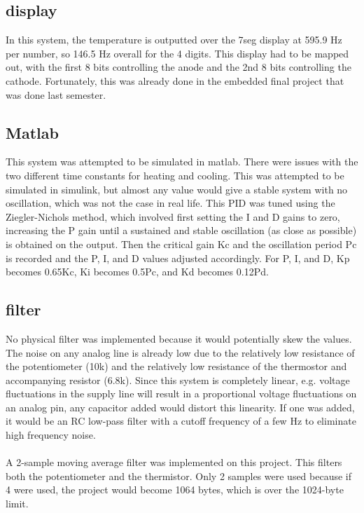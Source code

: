 \documentclass{hitec}
\begin{document}
\subsection{display}
In this system, the temperature is outputted over the 7seg display at 595.9 Hz per number, so 146.5 Hz overall for the 4 digits. This display had to be mapped out, with the first 8 bits controlling the anode and the 2nd 8 bits controlling the cathode. Fortunately, this was already done in the embedded final project that was done last semester. 
\\
\subsection{Matlab}
This system was attempted to be simulated in matlab. There were issues with the two different time constants for heating and cooling. This was attempted to be simulated in simulink, but almost any value would give a stable system with no oscillation, which was not the case in real life. This PID was tuned using the Ziegler-Nichols method, which involved first setting the I and D gains to zero, increasing the P gain until a sustained and stable oscillation (as close as possible) is obtained on the output. Then the critical gain Kc and the oscillation period Pc is recorded and the P, I, and D values adjusted accordingly. For P, I, and D, Kp becomes 0.65Kc, Ki becomes 0.5Pc, and Kd becomes 0.12Pd.
\subsection{filter}
No physical filter was implemented because it would potentially skew the values. The noise on any analog line is already low due to the relatively low resistance of the potentiometer (10k) and the relatively low resistance of the thermostor and accompanying resistor (6.8k). Since this system is completely linear, e.g. voltage fluctuations in the supply line will result in a proportional voltage fluctuations on an analog pin, any capacitor added would distort this linearity. If one was added, it would be an RC low-pass filter with a cutoff frequency of a few Hz to eliminate high frequency noise. 
\\
\\
A 2-sample moving average filter was implemented on this project. This filters both the potentiometer and the thermistor. Only 2 samples were used because if 4 were used, the project would become 1064 bytes, which is over the 1024-byte limit.
\end{document}
